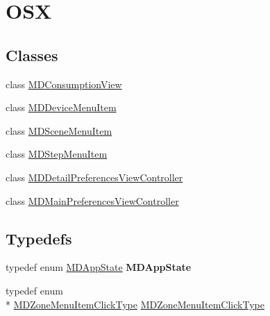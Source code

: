 \hypertarget{group___o_s_x}{\section{O\-S\-X}
\label{group___o_s_x}
}
\subsection*{Classes}
\begin{DoxyCompactItemize}
\item 
class \hyperlink{interface_m_d_consumption_view}{M\-D\-Consumption\-View}
\item 
class \hyperlink{interface_m_d_device_menu_item}{M\-D\-Device\-Menu\-Item}
\item 
class \hyperlink{interface_m_d_scene_menu_item}{M\-D\-Scene\-Menu\-Item}
\item 
class \hyperlink{interface_m_d_step_menu_item}{M\-D\-Step\-Menu\-Item}
\item 
class \hyperlink{interface_m_d_detail_preferences_view_controller}{M\-D\-Detail\-Preferences\-View\-Controller}
\item 
class \hyperlink{interface_m_d_main_preferences_view_controller}{M\-D\-Main\-Preferences\-View\-Controller}
\end{DoxyCompactItemize}
\subsection*{Typedefs}
\begin{DoxyCompactItemize}
\item 
\hypertarget{group___o_s_x_ga587958c8b86045347fbdb2a6cbe3e9ec}{typedef enum \hyperlink{group___o_s_x_ga20f017e8b56a6fadee4a1a5630628f19}{M\-D\-App\-State} {\bfseries M\-D\-App\-State}}\label{group___o_s_x_ga587958c8b86045347fbdb2a6cbe3e9ec}

\item 
typedef enum \\*
\hyperlink{group___o_s_x_gab0fcddeac9a07ecadc61a58ed26c2a7a}{M\-D\-Zone\-Menu\-Item\-Click\-Type} \hyperlink{group___o_s_x_gafcbdee8dea696159e77e84b68842c34d}{M\-D\-Zone\-Menu\-Item\-Click\-Type}
\end{DoxyCompactItemize}
